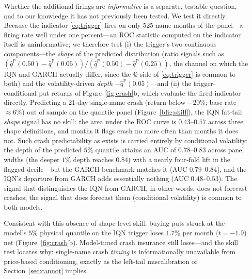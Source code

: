 \documentclass[11pt]{article}
\newcommand{\Q}{\mathbb{Q}}
\newcommand{\PP}{\mathbb{P}}
\begin{document}
Whether the additional firings are \emph{informative} is a separate, testable question, and to our knowledge it has not previously been tested. We test it directly. Because the indicator \eqref{eq:trigger} fires on only 525 name-months of the panel---a firing rate well under one percent---an ROC statistic computed on the indicator itself is uninformative; we therefore test (i) the trigger's two continuous components---the \emph{shape} of the predicted distribution (ratio signals such as $(\hat q^{\PP}(0.50)-\hat q^{\PP}(0.05))/(\hat q^{\PP}(0.50)-\hat q^{\PP}(0.25))$, the channel on which the IQN and GARCH actually differ, since the $\Q$ side of \eqref{eq:trigger} is common to both) and the volatility-driven \emph{depth} $-\hat q^{\PP}(0.05)$---and (ii) the trigger-conditional put returns of Figure~\ref{fig:crash}b, which evaluate the fired indicator directly. Predicting a $21$-day single-name crash (return below $-20\%$; base rate $\approx 6\%$) out of sample on the quantile panel (Figure~\ref{bfig:skill}), the IQN fat-tail \emph{shape} signal has no skill: the area under the ROC curve is $0.43$--$0.57$ across three shape definitions, and months it flags crash no more often than months it does not. Such crash predictability as exists is carried entirely by conditional volatility: the depth of the predicted $5\%$ quantile attains an AUC of $0.78$--$0.83$ across panel widths (the deeper $1\%$ depth reaches $0.84$) with a nearly four-fold lift in the flagged decile---but the GARCH benchmark matches it (AUC $0.79$--$0.84$), and the IQN's departure from GARCH adds essentially nothing (AUC $0.48$--$0.53$). The signal that distinguishes the IQN from GARCH, in other words, does not forecast crashes; the signal that does forecast them (conditional volatility) is common to both models.

Consistent with this absence of shape-level skill, buying puts struck at the model's $5\%$ physical quantile on the IQN trigger loses $1.7\%$ per month ($t=-1.9$) net (Figure~\ref{fig:crash}b). Model-timed crash insurance still loses---and the skill test locates why: single-name crash \emph{timing} is informationally unavailable from price-based conditioning, exactly as the left-tail miscalibration of Section~\ref{sec:cannot} implies.
\end{document}
